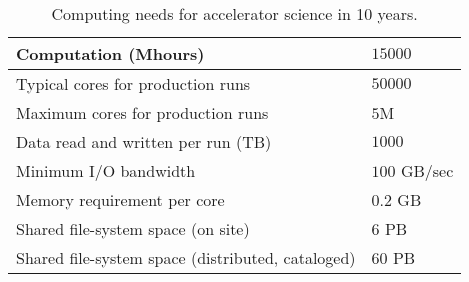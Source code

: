 \begin{table}[t]
\begin{center}
\caption{Computing needs for accelerator science in 10 years.}
\begin{tabular}{|l|l|} 
 \hline 
 Computation (Mhours) & $15000$ \\ \hline
 Typical cores for production runs & $50000$ \\ \hline
 Maximum cores for production runs & $5$M\\ \hline
 Data read and written per run (TB) & $1000$\\ \hline
 Minimum I/O bandwidth & $100$ GB/sec\\ \hline
 Memory requirement per core & $0.2$ GB \\ \hline
Shared file-system space (on site) & $6$ PB\\ \hline
Shared file-system space (distributed, cataloged) & $60$ PB\\ \hline
\end{tabular}
\label{tab:CompNeeds}
\end{center}
\end{table}
